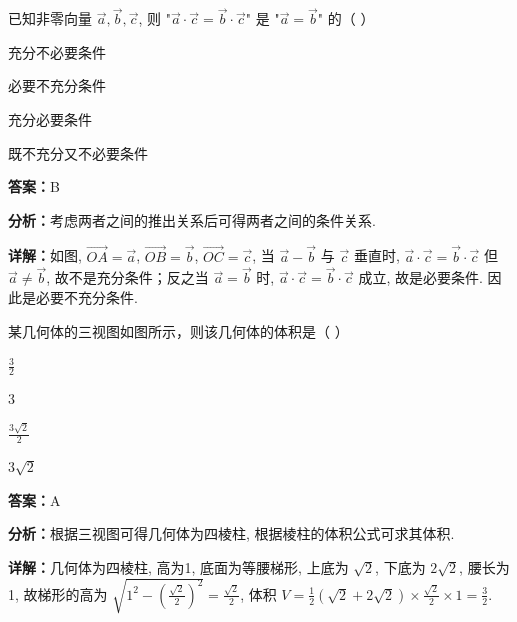 \begin{question}[points=4]
已知非零向量 $\vec{a},\vec{b},\vec{c}$, 则 "$\vec{a}\cdot\vec{c}=\vec{b}\cdot\vec{c}$" 是 "$\vec{a}=\vec{b}$" 的（   ）
\begin{choices}
  \item 充分不必要条件
  \item 必要不充分条件
  \item 充分必要条件
  \item 既不充分又不必要条件
\end{choices}
\begin{solution}
\textbf{答案：}B

\textbf{分析：}考虑两者之间的推出关系后可得两者之间的条件关系.

\textbf{详解：}如图, $\overrightarrow{OA}=\vec{a}$, $\overrightarrow{OB}=\vec{b}$, $\overrightarrow{OC}=\vec{c}$, 当 $\vec{a}-\vec{b}$ 与 $\vec{c}$ 垂直时, $\vec{a}\cdot\vec{c}=\vec{b}\cdot\vec{c}$ 但 $\vec{a}\neq\vec{b}$, 故不是充分条件；反之当 $\vec{a}=\vec{b}$ 时, $\vec{a}\cdot\vec{c}=\vec{b}\cdot\vec{c}$ 成立, 故是必要条件. 因此是必要不充分条件.
\end{solution}
\end{question}

\begin{question}[points=4]
某几何体的三视图如图所示，则该几何体的体积是（   ）
\begin{choices}
  \item $\frac{3}{2}$
  \item $3$
  \item $\frac{3\sqrt{2}}{2}$
  \item $3\sqrt{2}$
\end{choices}
\begin{solution}
\textbf{答案：}A

\textbf{分析：}根据三视图可得几何体为四棱柱, 根据棱柱的体积公式可求其体积.

\textbf{详解：}几何体为四棱柱, 高为1, 底面为等腰梯形, 上底为 $\sqrt{2}$, 下底为 $2\sqrt{2}$, 腰长为1, 故梯形的高为 $\sqrt{1^2 - \left(\frac{\sqrt{2}}{2}\right)^2} = \frac{\sqrt{2}}{2}$, 体积 $V = \frac{1}{2}(\sqrt{2}+2\sqrt{2})\times\frac{\sqrt{2}}{2}\times1 = \frac{3}{2}$.
\end{solution}
\end{question}

